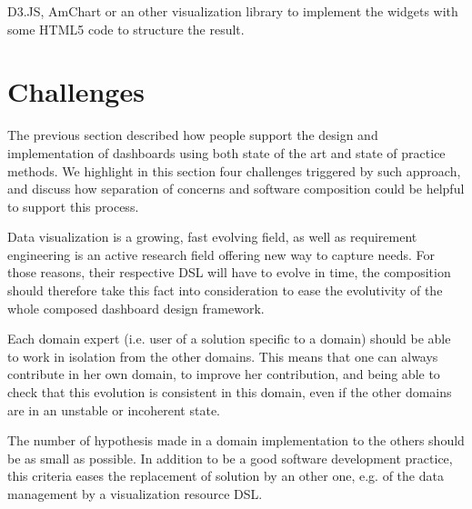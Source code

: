 \documentclass{acm_proc_article-sp}
\begin{document}
D3.JS, AmChart or an other visualization library to implement the widgets with some HTML5 code to structure the result.


\section{Challenges}

The previous section described how people support the design and
implementation of dashboards using both state of the art and state of
practice methods. We highlight in this section four challenges
triggered by such approach, and discuss how separation of concerns and
software composition could be helpful to support this process.


Data visualization is a growing, fast evolving field, as well as
requirement engineering is an active research field offering new way
to capture needs.  For those reasons, their respective DSL will have
to evolve in time, the composition should therefore take this fact
into consideration to ease the evolutivity of the whole composed
dashboard design framework.

Each domain expert (i.e. user of a solution specific to a domain)
should be able to work in isolation from the other domains. This means
that one can always contribute in her own domain, to improve her
contribution, and being able to check that this evolution is
consistent in this domain, even if the other domains are in an
unstable or incoherent state.

The number of hypothesis made in a domain implementation to the others
should be as small as possible. In addition to be a good software
development practice, this criteria eases the replacement of solution
by an other one, e.g. of the data management by a visualization
resource DSL.
\end{document}
